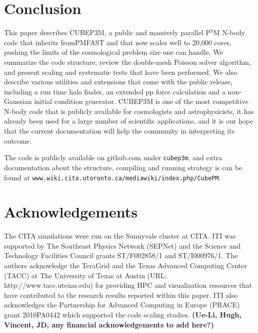 \section{Conclusion}

This paper describes {\small CUBEP3M}, a public and  massively parallel P$^3$M N-body code that inherits from{\small PMFAST} 
 and that now scales well to 20,000 cores, pushing the limits of the cosmological problem size one can handle.
We summarize the code structure, review the double-mesh Poisson solver algorithm, and present scaling and systematic tests
that have been performed. We also describe various utilities and extensions that come with the public release, 
including a run time halo finder, an extended pp force calculation and a non-Gaussian initial condition generator.
{\small CUBEP3M} is one of the most competitive N-body code that is publicly available for cosmologists and astrophysicists,
it has already been used  for a large number of scientific applications, and it is our hope that the current documentation will 
help the community in interpreting its outcome.


The code is publicly available on github.com under {\tt cubep3m}, and extra documentation about the structure, 
compiling and running strategy is can be found at {\tt www.wiki.cita.utoronto.ca/mediawiki/index.php/CubePM}.

\section*{Acknowledgements}

The CITA simulations were run on the Sunnyvale cluster at CITA.
ITI was supported by The Southeast Physics
Network (SEPNet) and the Science and Technology Facilities Council
grants ST/F002858/1 and ST/I000976/1. The authors acknowledge the
TeraGrid and the Texas Advanced Computing Center (TACC) at The
University of Texas at Austin (URL: http://www.tacc.utexas.edu) for
providing HPC and visualization resources that have contributed to the
research results reported within this paper. ITI also acknowledges the Partnership for Advanced
Computing in Europe (PRACE) grant 2010PA0442 which supported the code
scaling studies. {\bf (Ue-Li, Hugh, Vincent, JD, any financial acknowledgements to add here?)}
